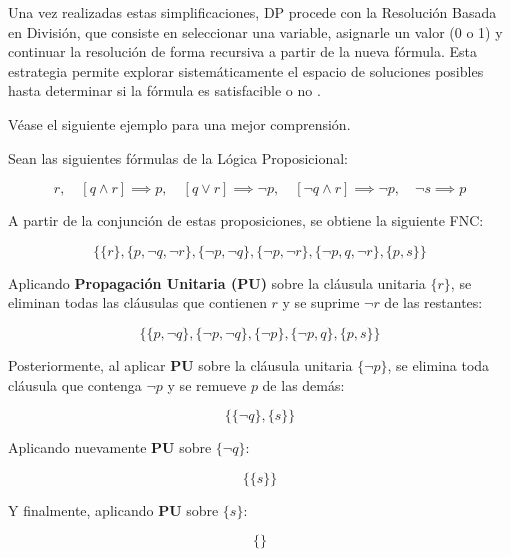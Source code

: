 Una vez realizadas estas simplificaciones, DP procede con la Resolución Basada en División, que consiste en seleccionar una variable, asignarle un valor (0 o 1) y continuar la resolución de forma recursiva a partir de la nueva fórmula. Esta estrategia permite explorar sistemáticamente el espacio de soluciones posibles hasta determinar si la fórmula es satisfacible o no \cite{garcia-satcap}.

V\'ease el siguiente ejemplo \cite{garcia-satcap} para una mejor comprensi\'on.

Sean las siguientes fórmulas de la Lógica Proposicional:

\begin{equation*}
    r, \quad [q \land r] \implies p, \quad [q \lor r] \implies \neg p, \quad [\neg q \land r] \implies \neg p, \quad \neg s \implies p
\end{equation*}

A partir de la conjunción de estas proposiciones, se obtiene la siguiente FNC:

\begin{equation*}
    \{\{r\}, \{p,\neg q, \neg r\}, \{\neg p, \neg q\}, \{\neg p, \neg r\}, \{\neg p, q, \neg r\}, \{p, s\}\}
\end{equation*}

Aplicando \textbf{Propagación Unitaria (PU)} sobre la cláusula unitaria $\{r\}$, se eliminan todas las cláusulas que contienen $r$ y se suprime $\neg r$ de las restantes:

\begin{equation*}
    \{\{p,\neg q\}, \{\neg p,\neg q\}, \{\neg p\}, \{\neg p,q\}, \{p,s\}\}
\end{equation*}

Posteriormente, al aplicar \textbf{PU} sobre la cláusula unitaria $\{\neg p\}$, se elimina toda cláusula que contenga $\neg p$ y se remueve $p$ de las demás:

\begin{equation*}
    \{\{\neg q\}, \{s\}\}
\end{equation*}

Aplicando nuevamente \textbf{PU} sobre $\{\neg q\}$:

\begin{equation*}
    \{\{s\}\}
\end{equation*}

Y finalmente, aplicando \textbf{PU} sobre $\{s\}$:

\begin{equation*}
    \{\}
\end{equation*}

